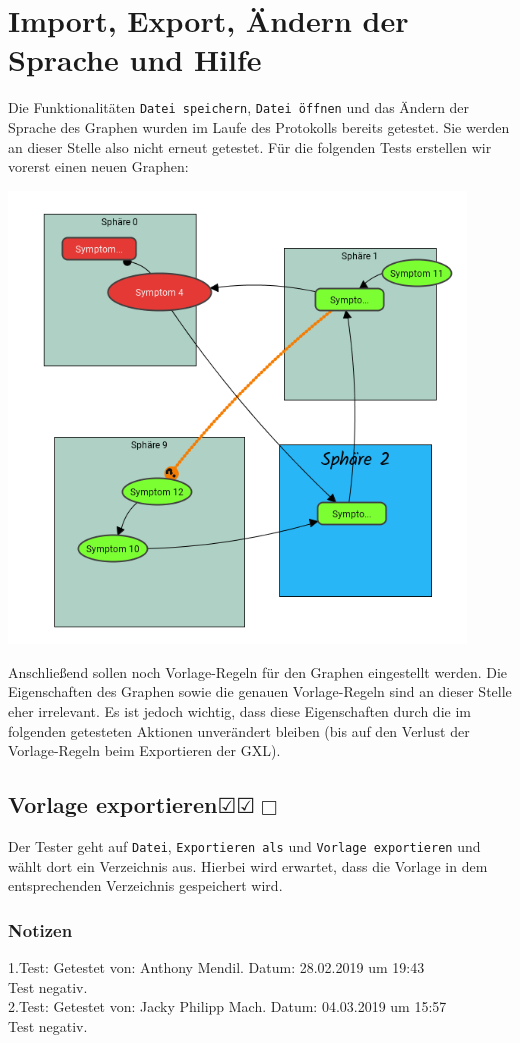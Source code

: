 \documentclass[enabledeprecatedfontcommands]{scrartcl}
\newcommand{\subsectiont}[2]{\subsection[#1]{#1{\normalsize\normalfont #2}}}
\newcommand{\leer}{$\Box$}
\newcommand{\ok}{$\CheckedBox$}
\begin{document}
\section{Import, Export, Ändern der Sprache und Hilfe}
Die Funktionalitäten \texttt{Datei speichern}, \texttt{Datei öffnen} und das Ändern der Sprache des Graphen wurden im Laufe des Protokolls bereits getestet. Sie werden an dieser Stelle also nicht erneut getestet. Für die folgenden Tests erstellen wir vorerst einen neuen Graphen: 
\begin{center}
\includegraphics[height=12cm]{graphfuerExportkram.PNG}
\end{center}
Anschließend sollen noch Vorlage-Regeln für den Graphen eingestellt werden. Die Eigenschaften des Graphen sowie die genauen Vorlage-Regeln sind an dieser Stelle eher irrelevant. Es ist jedoch wichtig, dass diese Eigenschaften durch die im folgenden getesteten Aktionen unverändert bleiben (bis auf den Verlust der Vorlage-Regeln beim Exportieren der GXL). 
\newpage

\subsectiont{Vorlage exportieren}{\dotfill\ok\ok\leer}
Der Tester geht auf \texttt{Datei}, \texttt{Exportieren als} und \texttt{Vorlage exportieren} und wählt dort ein Verzeichnis aus. Hierbei wird erwartet, dass die Vorlage in dem entsprechenden Verzeichnis gespeichert wird.
\subsubsection{Notizen}
1.Test: Getestet von: Anthony Mendil. Datum: 28.02.2019 um 19:43 \\
Test negativ.\\
2.Test: Getestet von: Jacky Philipp Mach. Datum: 04.03.2019 um 15:57 \\
Test negativ.
\end{document}
